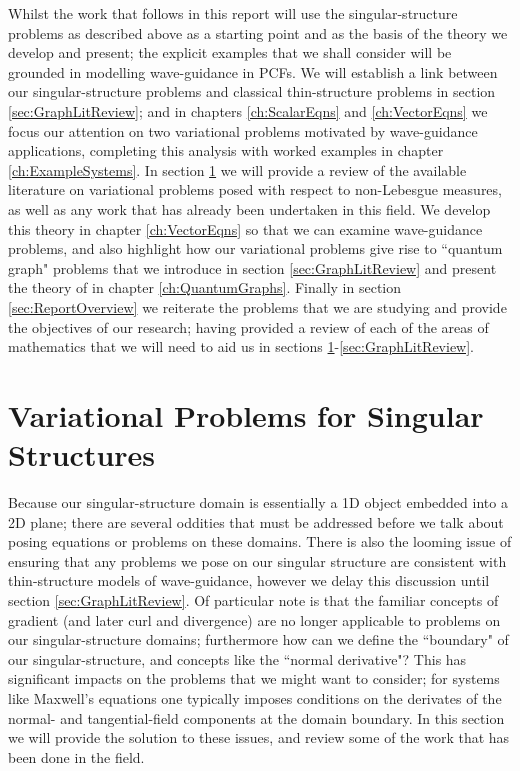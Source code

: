 Whilst the work that follows in this report will use the singular-structure problems as described above as a starting point and as the basis of the theory we develop and present; the explicit examples that we shall consider will be grounded in modelling wave-guidance in PCFs.
We will establish a link between our singular-structure problems and classical thin-structure problems in section \ref{sec:GraphLitReview}; and in chapters \ref{ch:ScalarEqns} and \ref{ch:VectorEqns} we focus our attention on two variational problems motivated by wave-guidance applications, completing this analysis with worked examples in chapter \ref{ch:ExampleSystems}.
In section \ref{sec:VariationalProblemLitReview} we will provide a review of the available literature on variational problems posed with respect to non-Lebesgue measures, as well as any work that has already been undertaken in this field.
We develop this theory in chapter \ref{ch:VectorEqns} so that we can examine wave-guidance problems, and also highlight how our variational problems give rise to ``quantum graph" problems that we introduce in section \ref{sec:GraphLitReview} and present the theory of in chapter \ref{ch:QuantumGraphs}.
Finally in section \ref{sec:ReportOverview} we reiterate the problems that we are studying and provide the objectives of our research; having provided a review of each of the areas of mathematics that we will need to aid us in sections \ref{sec:VariationalProblemLitReview}-\ref{sec:GraphLitReview}.

\section{Variational Problems for Singular Structures} \label{sec:VariationalProblemLitReview}
Because our singular-structure domain is essentially a 1D object embedded into a 2D plane; there are several oddities that must be addressed before we talk about posing equations or problems on these domains.
There is also the looming issue of ensuring that any problems we pose on our singular structure are consistent with thin-structure models of wave-guidance, however we delay this discussion until section \ref{sec:GraphLitReview}.
Of particular note is that the familiar concepts of gradient (and later curl and divergence) are no longer applicable to problems on our singular-structure domains; furthermore how can we define the ``boundary" of our singular-structure, and concepts like the ``normal derivative"?
This has significant impacts on the problems that we might want to consider; for systems like Maxwell's equations one typically imposes conditions on the derivates of the normal- and tangential-field components at the domain boundary. 
In this section we will provide the solution to these issues, and review some of the work that has been done in the field. \newline

